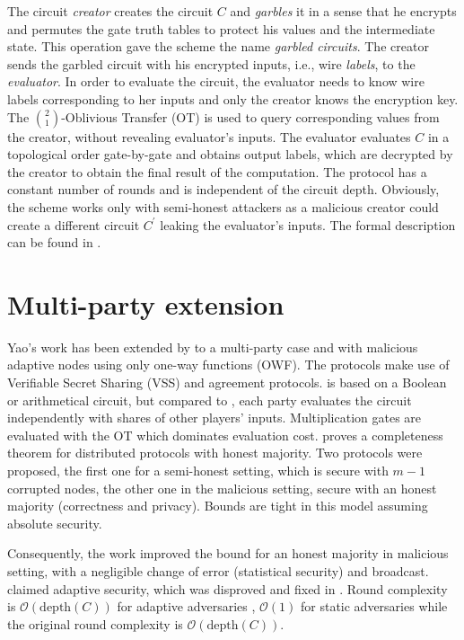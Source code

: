 \documentclass[
  digital, %
  twoside, %
  table,   %
  lof,     %
  lot,     %
]{fithesis3}
\newcommand{\bigO}[0]{\mathcal{O}}
\newcounter{ph4_show_guides}
\theoremstyle{definition}
\theoremstyle{remark}
\begin{document}
The circuit \emph{creator} creates the circuit $C$ and \emph{garbles} it in a sense that he encrypts and permutes the gate truth tables to protect his values and the intermediate state. This operation gave the scheme the name \emph{garbled circuits}. The creator sends the garbled circuit with his encrypted inputs, i.e., wire \emph{labels}, to the \emph{evaluator}. In order to evaluate the circuit, the evaluator needs to know wire labels corresponding to her inputs and only the creator knows the encryption key. The $\binom{2}{1}$-Oblivious Transfer (OT) \cite{rabin81,EGL85,Kil88} is used to query corresponding values from the creator, without revealing evaluator's inputs. The evaluator evaluates $C$ in a topological order gate-by-gate and obtains output labels, which are decrypted by the creator to obtain the final result of the computation. The protocol has a constant number of rounds and is independent of the circuit depth. 
Obviously, the scheme works only with semi-honest attackers as a malicious creator could create a different circuit $C^\prime$ leaking the evaluator's inputs. The formal description can be found in \cite{BHR12}. 

\section{Multi-party extension}\label{sec:soa:mpc}%
Yao's work has been extended by \cite{GMW87} to a multi-party case and with malicious adaptive nodes using only one-way functions (OWF). The protocols make use of Verifiable Secret Sharing (VSS) and agreement protocols. \cite{GMW87} is based on a Boolean or arithmetical circuit, but compared to \cite{Yao86}, each party evaluates the circuit independently with shares of other players' inputs. Multiplication gates are evaluated with the OT which dominates evaluation cost. \cite{GMW87} proves a completeness theorem for distributed protocols with honest majority. Two protocols were proposed, the first one for a semi-honest setting, which is secure with $m-1$ corrupted nodes, the other one in the malicious setting, secure with an honest majority (correctness and privacy). Bounds are tight in this model assuming absolute security. 

Consequently, the work \cite{RB89, B91} improved the bound for an honest majority in malicious setting, with a negligible change of error (statistical security) and broadcast.
\cite{RB89} claimed adaptive security, which was disproved and fixed in \cite{CDDHR99}.
Round complexity is $\bigO(\text{depth}(C))$ for adaptive adversaries \cite{GMW87, CDDHR99}, $\bigO(1)$ for static adversaries \cite{BMR90} while the original \cite{GMW87} round complexity is $\bigO(\text{depth}(C))$.
\end{document}
